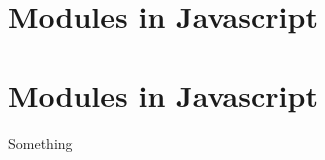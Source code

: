 %
%
%

\newcommand{\CntLIHeadingText}{\section{Modules in Javascript}\label{sec:javascript-modules-1.0.0}}

\ifdefined\CntLIHeading
    \CntLIHeadingText
\else
    \ifdefined\CntLIHeadingJavascriptModulesVIvOvO
        \CntLIHeadingText
    \fi
\fi

Something
